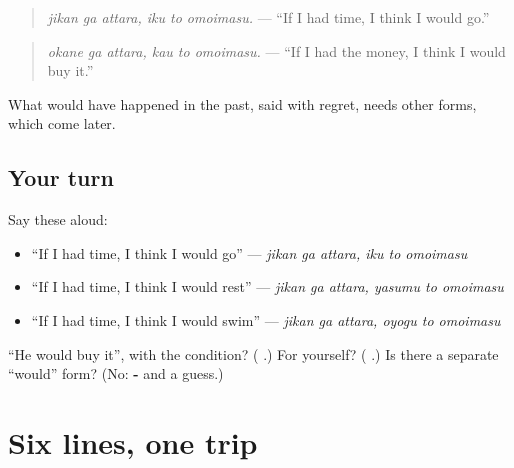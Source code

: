 \begin{quote}
\emph{jikan ga attara, iku to omoimasu.} — \textquotedblleft{}If I had time, I think I would go.\textquotedblright{}
\end{quote}

\begin{quote}
\textbf{  }
\end{quote}

\begin{quote}
\emph{okane ga attara, kau to omoimasu.} — \textquotedblleft{}If I had the money, I think I would buy it.\textquotedblright{}
\end{quote}

What would have happened in the past, said with regret, needs other forms, which come later.

\subsection*{Your turn}
Say these aloud:

\begin{itemize}
\raggedright
  \item \textquotedblleft{}If I had time, I think I would go\textquotedblright{} — \emph{jikan ga attara, iku to omoimasu}
  \item \textquotedblleft{}If I had time, I think I would rest\textquotedblright{} — \emph{jikan ga attara, yasumu to omoimasu}
  \item \textquotedblleft{}If I had time, I think I would swim\textquotedblright{} — \emph{jikan ga attara, oyogu to omoimasu}
\end{itemize}

\begin{tcolorbox}[breakable,colback=teal!4,colframe=teal!35!black,title={Before you move on}]
\textquotedblleft{}He would buy it\textquotedblright{}, with the condition? (\textbf{ }.) For yourself? (\textbf{ }.) Is there a separate \textquotedblleft{}would\textquotedblright{} form? (No: \textbf{-} and a guess.)
\end{tcolorbox}
\section[(six lines)]{Six lines, one trip}

\label{lesson:JA-W261-six-lines}



